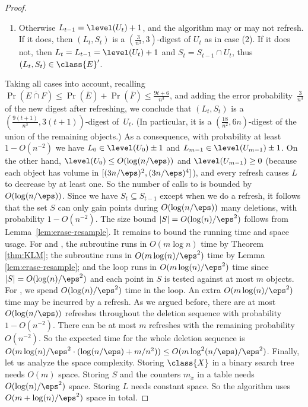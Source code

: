 \begin{proof}
\begin{enumerate}[label={(\arabic*)}]
\[            \leq \frac{24 \log n}{\eps^2}.
        \]
        So the algorithm refreshes. During refresh, the algorithm computes $L' \in \level(U_t) \pm 1$ with probability at least $1 - \tfrac 1{n^3}$ by Theorem~\ref{thm:KLM}, and then we have $L_t = \min \set{L_{t-1}-1, L'} = L' \in \level(U_t) \pm 1$. Hence, it returns a $(\frac{3}{n^3}, 3)$-digest $(L_t, S_t)$ of $U_t$ by Lemma~\ref{lem:erase-resample}.
%
        \item Otherwise $L_{t-1} = \level(U_t) + 1$, and the algorithm may or may not refresh. If it does, then $(L_t,S_t)$ is a $(\frac{3}{n^3}, 3)$-digest of $U_t$ as in case (2). If it does not, then $L_t = L_{t-1} = \level(U_t) + 1$ and $S_t = S_{t-1} \cap U_t$, thus $(L_t, S_t) \in \class{E}'$.
    \end{enumerate}
    Taking all cases into account, recalling $\Pr(\overline{E \cap F}) \leq \Pr(\overline{E}) + \Pr(\overline{F}) \leq \frac{9t+6}{n^3}$, and adding the error probability~$\tfrac{3}{n^3}$ of the new digest after refreshing, we conclude that $(L_t, S_t)$ is a $(\frac{9(t+1)}{n^3}, 3(t+1))$-digest of~$U_t$. (In particular, it is a $(\frac{18}{n^2}, 6n)$-digest of the union of the remaining objects.)
%
    As a consequence, with probability at least $1 - O(n^{-2})$ we have $L_0 \in \level(U_0) \pm 1$ and $L_{m-1} \in \level(U_{m-1}) \pm 1$. On the other hand, $\level(U_0) \leq O(\log(n/\eps))$ and $\level(U_{m-1}) \geq 0$ (because each object has volume in $[(3n/\eps)^2, (3n/\eps)^4]$), and every refresh causes $L$ to decrease by at least one. So the number of calls to  is bounded by $O(\log(n/\eps))$. Since we have $S_t \subseteq S_{t-1}$ except when we do a refresh, it follows that the set $S$ can only gain points during $O(\log(n/\eps))$ many deletions, with probability $1 - O(n^{-2})$.
%
    The size bound $|S| = O(\log(n)/\eps^2)$ follows from Lemma~\ref{lem:erase-resample}.
%
    It remains to bound the running time and space usage.
    For \initialize and , the subroutine \KLM runs in $O(m \log n)$ time by Theorem \ref{thm:KLM}; the subroutine \resample runs in $O(m \log (n) / \eps^2)$ time by Lemma \ref{lem:erase-resample}; and the loop runs in $O(m \log(n) / \eps^2)$ time since $|S| = O(\log(n)/\eps^2)$ and each point in $S$ is tested against at most $m$ objects.
%
    For \del, we spend $O(\log (n) / \eps^2)$ time in the loop. An extra $O(m \log (n) / \eps^2)$ time may be incurred by a refresh. As we argued before, there are at most $O(\log(n/\eps))$ refreshes throughout the deletion sequence with probability $1 - O(n^{-2})$. There can be at most $m$ refreshes with the remaining probability $O(n^{-2})$. So the expected time for the whole deletion sequence is $O(m \log(n) / \eps^2 \cdot (\log(n/\eps) + m/n^2)) \leq O(m \log^2(n/\eps)/\eps^2)$.
%
    Finally, let us analyze the space complexity. Storing $\class{X}$ in a binary search tree needs $O(m)$ space. Storing $S$ and the counters $m_x$ in a table needs $O(\log(n)/\eps^2)$ space. Storing $L$ needs constant space. So the algorithm uses $O(m + \log(n)/\eps^2)$ space in total.
\end{proof}
%
